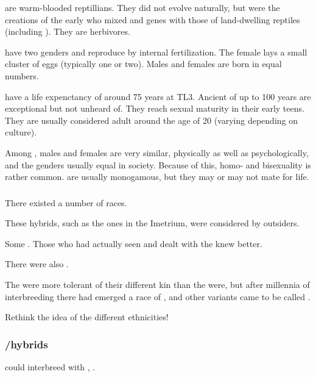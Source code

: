 \Scathae{} are warm-blooded reptillians. They did not evolve naturally, but were the creations of the early \dragonlords{} who mixed \dragon{} and \naga{} genes with those of land-dwelling reptiles (including \nycans{}). They are herbivores. 

\Scathae{} have two genders and reproduce by internal fertilization. The female lays a small cluster of eggs (typically one or two). Males and females are born in equal numbers. 

\Scathae{} have a life expenctancy of around 75 years at TL3. Ancient \scathae{} of up to 100 years are exceptional but not unheard of. They reach sexual maturity in their early teens. They are usually considered adult around the age of 20 (varying depending on culture). 

Among \scathae{}, males and females are very similar, physically as well as psychologically, and the genders usually equal in society. Because of this, homo- and bisexuality is rather common. \Scathae{} are usually monogamous, but they may or may not mate for life.  





\subsubsection{\Demiscathae}
There existed a number of \quo{\demiscatha} races. 

\begin{gloss}
    These hybrids, such as the ones in the Imetrium, were considered \demiscathae by outsiders. 
  
    Some .
    Those who had actually seen and dealt with the \nagae knew better.
\end{gloss}

There were also .

The \scathae were more tolerant of their different kin than the \humans were, but after millennia of interbreeding there had emerged a race of  \scathae, and other variants came to be called \quo{\demiscathae}. 

Rethink the idea of the different \scatha ethnicities!





\subsubsection{\Scatha/\naga hybrids}
\Scathae could interbreed with \nagae, . 










